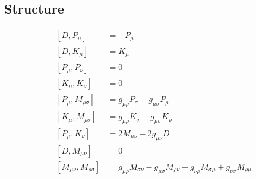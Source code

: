\subsection{Structure}

\begin{align*}
[D, P_\mu] &= -P_\mu \\
[D, K_\mu] &= K_\mu \\
[P_\mu, P_\nu] &= 0 \\
[K_\mu, K_\nu] &= 0 \\
[P_\mu, M_{\rho\sigma}] &= g_{\mu\rho} P_\sigma - g_{\mu\sigma} P_\rho \\
[K_\mu, M_{\rho\sigma}] &= g_{\mu\rho} K_\sigma - g_{\mu\sigma} K_\rho \\
[P_\mu, K_\nu] &= 2 M_{\mu\nu} - 2 g_{\mu\nu} D \\
[D, M_{\mu\nu}] &= 0 \\
[M_{\mu\nu}, M_{\rho\sigma}] &= g_{\mu\rho} M_{\sigma\nu} - g_{\mu\sigma} M_{\rho\nu} - g_{\nu\rho} M_{\sigma\mu} + g_{\nu\sigma} M_{\rho\mu}
\end{align*}

